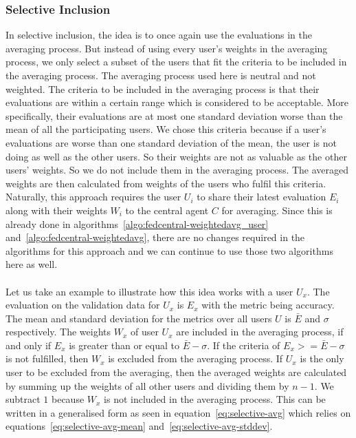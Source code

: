 \documentclass[12pt]{article}
\begin{document}
\subsubsection{Selective Inclusion}\label{subsubsec:selective-inclusion}
In selective inclusion, the idea is to once again use the evaluations in the averaging process. But instead of using every user's weights in the averaging process, we only select a subset of the users that fit the criteria to be included in the averaging process. The averaging process used here is neutral and not weighted. The criteria to be included in the averaging process is that their evaluations are within a certain range which is considered to be acceptable. More specifically, their evaluations are at most one standard deviation worse than the mean of all the participating users. We chose this criteria because if a user's evaluations are worse than one standard deviation of the mean, the user is not doing as well as the other users. So their weights are not as valuable as the other users' weights. So we do not include them in the averaging process.  The averaged weights are then calculated from weights of the users who fulfil this criteria. Naturally, this approach requires the user $U_i$ to share their latest evaluation $E_i$ along with their weights $W_i$ to the central agent $C$ for averaging. Since this is already done in algorithms~\ref{algo:fedcentral-weightedavg_user} and~\ref{algo:fedcentral-weightedavg}, there are no changes required in the algorithms for this approach and we can continue to use those two algorithms here as well.
\\\\
Let us take an example to illustrate how this idea works with a user $U_x$. The evaluation on the validation data for $U_x$ is $E_x$ with the metric being accuracy. The mean and standard deviation for the metrics over all users $U$ is $\bar{E}$ and $\sigma$ respectively. The weights $W_x$ of user $U_x$ are included in the averaging process, if and only if $E_x$ is greater than or equal to $\bar{E}-\sigma$. If the criteria of $E_x >= \bar{E}-\sigma$ is not fulfilled, then $W_x$ is excluded from the averaging process. If $U_x$ is the only user to be excluded from the averaging, then the averaged weights are calculated by summing up the weights of all other users and dividing them by $n-1$. We subtract $1$ because $W_x$ is not included in the averaging process. This can be written in a generalised form as seen in equation~\ref{eq:selective-avg} which relies on equations~\ref{eq:selective-avg-mean} and~\ref{eq:selective-avg-stddev}.
\end{document}
